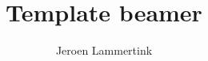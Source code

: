 \newcommand*{\BEAMERCLASS}{}


\title{Template beamer}
\author{Jeroen Lammertink}
\begin{frame}
\titlepage
\end{frame}


